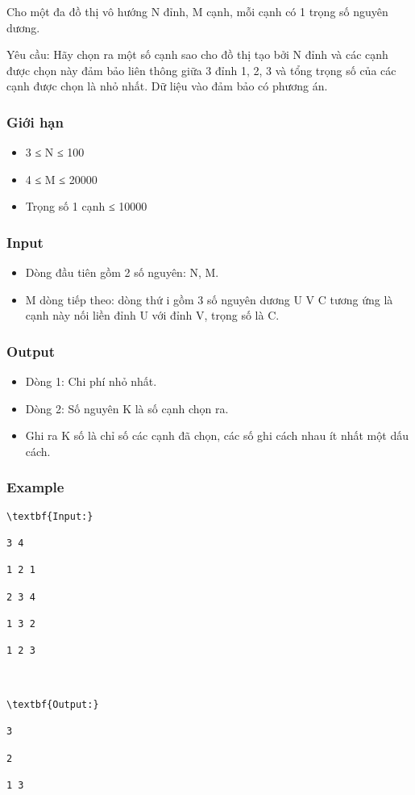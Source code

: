 

Cho một đa đồ thị vô hướng N đỉnh, M cạnh, mỗi cạnh có 1 trọng số nguyên dương.

Yêu cầu: Hãy chọn ra một số cạnh sao cho đồ thị tạo bởi N đỉnh và các cạnh được chọn này đảm bảo liên thông giữa 3 đỉnh 1, 2, 3 và tổng trọng số của các cạnh được chọn là nhỏ nhất. Dữ liệu vào đảm bảo có phương án.

\subsubsection{Giới hạn}
\begin{itemize}
	\item 3 ≤ N ≤ 100
	\item 4 ≤ M ≤ 20000
	\item Trọng số 1 cạnh ≤ 10000
\end{itemize}

\subsubsection{Input}
\begin{itemize}
	\item Dòng đầu tiên gồm 2 số nguyên: N, M.
	\item M dòng tiếp theo: dòng thứ i gồm 3 số nguyên dương U V C tương ứng là cạnh này nối liền đỉnh U với đỉnh V, trọng số là C.
\end{itemize}

\subsubsection{Output}
\begin{itemize}
	\item Dòng 1: Chi phí nhỏ nhất.
	\item Dòng 2: Số nguyên K là số cạnh chọn ra.
	\item Ghi ra K số là chỉ số các cạnh đã chọn, các số ghi cách nhau ít nhất một dấu cách.
\end{itemize}

\subsubsection{Example}
\begin{verbatim}
\textbf{Input:}

3 4

1 2 1

2 3 4

1 3 2

1 2 3



\textbf{Output:}

3

2

1 3

\end{verbatim}